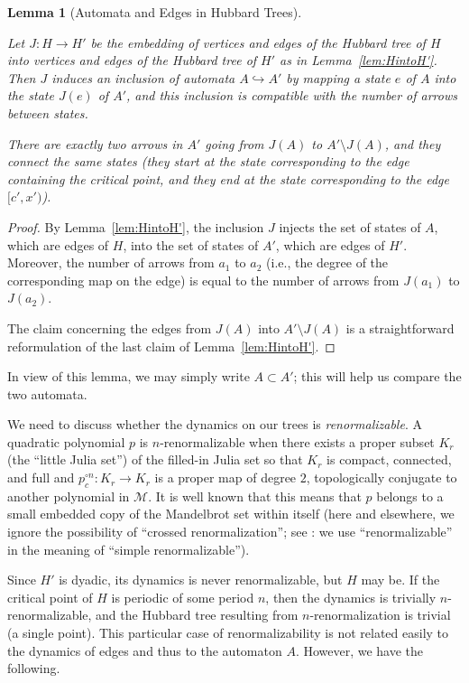 \documentclass[12pt]{amsart}
\newcommand{\M}{\mathscr M}
\newcommand{\0}{\texttt{0}}
\newcommand{\1}{\texttt{1}}
\newtheorem{lemma}[theorem]{Lemma}
\theoremstyle{definition}
\numberwithin{equation}{section}
\newcommand{\lineclear}{\rule{0pt}{2pt}\newline}
\begin{document}
\begin{lemma}[Automata and Edges in Hubbard Trees]
\label{Lem:MappingEdgesHubbardTrees} \lineclear
Let $J : H\to H'$ be the embedding of vertices and edges of the Hubbard tree of $H$ into vertices and edges of the Hubbard tree of $H'$ as in Lemma~\ref{lem:HintoH'}. Then $J$ induces an inclusion of automata $A \hookrightarrow A'$ by mapping a state $e$ of $A$ into the state $J(e)$ of $A'$, {and this inclusion is compatible with the number of arrows between states}.

There are exactly two arrows in $A'$ going from $J(A)$ to $A'\setminus J(A)$, and they connect the same states (they start at the state corresponding to the edge containing the critical point, and they end at the state corresponding to the edge $[c',x')$).
\end{lemma}
\begin{proof}
By Lemma~\ref{lem:HintoH'}, the inclusion $J$ injects the set of states of $A$, which are edges of $H$, into the set of states of $A'$, which are edges of $H'$. Moreover, the number of arrows from $a_1$ to $a_2$ (i.e., the degree of the corresponding map on the edge) is equal to the number of arrows from $J(a_1)$ to $J(a_2)$.

The claim concerning the edges from $J(A)$ into $A'\setminus J(A)$ is a straightforward reformulation of the last claim of Lemma~\ref{lem:HintoH'}.
\end{proof}


In view of this lemma, we may simply write $A\subset A'$; this will help us compare the two automata.

We need to discuss whether the dynamics on our trees is \emph{renormalizable}. A quadratic polynomial $p$ is $n$-renormalizable when there exists a proper subset $K_r$  (the ``little Julia set'') of the filled-in Julia set so that $K_r$ is compact, connected, and full and $p_c^{\circ n}\colon K_r\to K_r$ is a proper map of degree $2$, topologically conjugate to another polynomial in $\M$. It is well known that this means that $p$ belongs to a small embedded copy of the Mandelbrot set within itself (here and elsewhere, we ignore the possibility of ``crossed renormalization''; see \cite{McMullenRenormalization,CrossRenorm}: we use ``renormalizable'' in the meaning of ``simple renormalizable''). 

Since $H'$ is dyadic, its dynamics is never renormalizable, but $H$ may be.  
If the critical point of $H$ is periodic of some period $n$, then the dynamics is trivially $n$-renormalizable, and the Hubbard tree resulting from $n$-renormalization is trivial (a single point). This particular case of renormalizability is not related easily to the dynamics of edges and thus to the automaton $A$. However, we have the following.  
\end{document}
